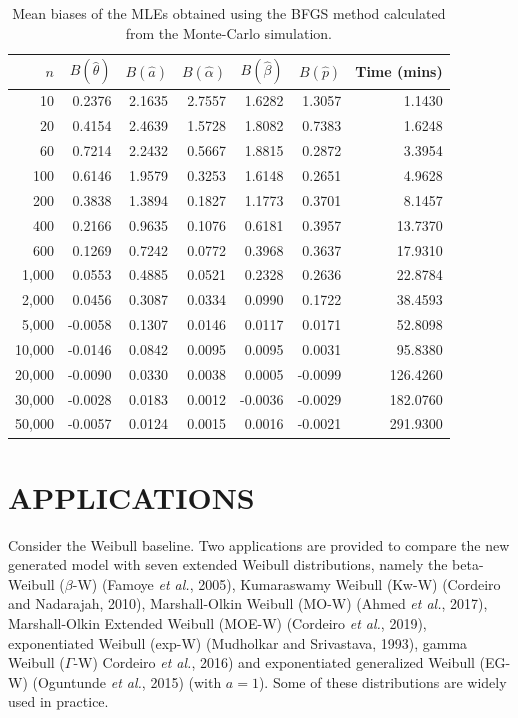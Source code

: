 \documentclass[twoside,leqno,11pt]{article}
\begin{document}
\begin{table}[H]
	\centering
	\caption{Mean biases of the MLEs obtained using the BFGS method calculated from the Monte-Carlo simulation.}\label{tab:bias}
	\begin{tabular}{rrrrrrr}
		\hline
		$n$ & $B(\hat{\theta})$ & $B(\hat{a})$ & $B(\hat{\alpha})$ & $B(\hat{\beta})$ & $B(\hat{p})$ & Time (mins)\\
		\hline
		10 & 0.2376 & 2.1635 & 2.7557 & 1.6282 & 1.3057 & 1.1430\\
		20 & 0.4154 & 2.4639 & 1.5728 & 1.8082 & 0.7383 & 1.6248\\
		60 & 0.7214 & 2.2432 & 0.5667 & 1.8815 & 0.2872 & 3.3954\\
		100 & 0.6146 & 1.9579 & 0.3253 & 1.6148 & 0.2651 & 4.9628\\
		200 & 0.3838 & 1.3894 & 0.1827 & 1.1773 & 0.3701 & 8.1457\\
		400 & 0.2166 & 0.9635 & 0.1076 & 0.6181 & 0.3957 & 13.7370\\
		600 & 0.1269 & 0.7242 & 0.0772 & 0.3968 & 0.3637 & 17.9310\\
		1,000 & 0.0553 & 0.4885 & 0.0521 & 0.2328 & 0.2636 & 22.8784 \\
		2,000  &  0.0456 & 0.3087 &  0.0334 &  0.0990 & 0.1722 &  38.4593\\
		5,000 & -0.0058 & 0.1307 & 0.0146 & 0.0117 & 0.0171 & 52.8098\\
		10,000 & -0.0146 & 0.0842 & 0.0095 & 0.0095 & 0.0031 & 95.8380\\
		20,000 & -0.0090 & 0.0330 & 0.0038 & 0.0005 & -0.0099 & 126.4260\\
		30,000 & -0.0028 & 0.0183 & 0.0012 & -0.0036 & -0.0029 & 182.0760\\
		50,000 & -0.0057 & 0.0124 & 0.0015 & 0.0016 & -0.0021 & 291.9300\\
		\hline
	\end{tabular}
\end{table}


\section{APPLICATIONS}\label{applications}

Consider the Weibull baseline. Two applications are provided to compare the new generated model with seven extended Weibull
distributions, namely the beta-Weibull ($\beta$-W) (Famoye {\it et al.}, 2005), Kumaraswamy Weibull (Kw-W) (Cordeiro and Nadarajah, 2010),
Marshall-Olkin Weibull (MO-W) (Ahmed {\it et al.}, 2017), Marshall-Olkin Extended Weibull (MOE-W) (Cordeiro {\it et al.}, 2019),
exponentiated Weibull (exp-W) (Mudholkar and Srivastava, 1993), gamma Weibull ($\Gamma$-W) Cordeiro {\it et al.}, 2016) and exponentiated
generalized Weibull (EG-W) (Oguntunde {\it et al.}, 2015) (with $a=1$). Some of these distributions are widely used in practice.
\end{document}
